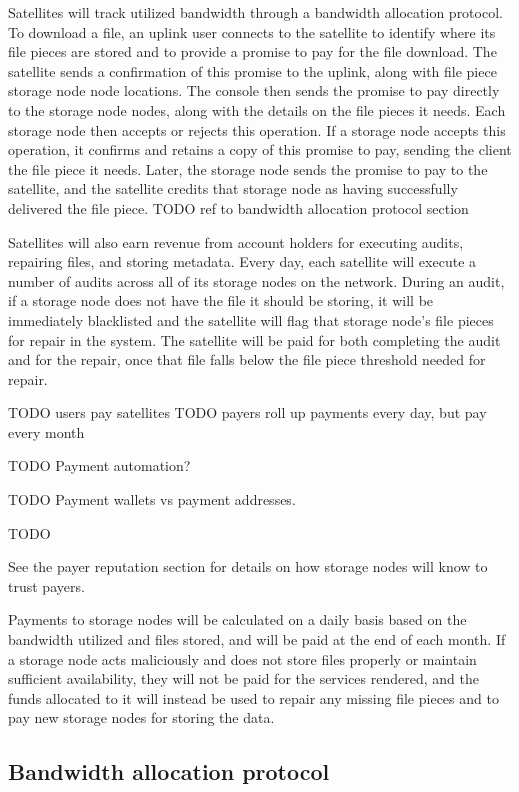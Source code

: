 \documentclass[11pt,fleqn,openany]{book}
\newcommand{\todo}[1]{{\color{red} TODO #1 }}
\begin{document}
Satellites will track utilized bandwidth through a bandwidth allocation
protocol. To download a file, an uplink user connects to the satellite to
identify where its file pieces are stored and to provide a promise to pay for
the file download. The satellite sends a confirmation of this promise
to the uplink, along with file piece storage node node locations.
The console then sends the promise to pay directly
to the storage node nodes, along with the details on the file pieces it needs.
Each storage node then accepts or rejects this operation.
If a storage node accepts this
operation, it confirms and retains a copy of this promise to pay, sending the
client the file piece it needs. Later, the storage node sends the promise to
pay to
the satellite, and the satellite credits that storage node as having
successfully delivered the file piece.
\todo{ref to bandwidth allocation protocol section}

Satellites will also earn revenue from account holders for executing audits,
repairing files, and storing metadata. Every day, each satellite will execute
a number of audits across all of its storage nodes on the network. During an
audit,
if a storage node does not have the file it should be storing, it will be
immediately
blacklisted and the satellite will flag that storage node’s file pieces for
repair
in the system.
The satellite will be paid for both completing the audit
and for the repair,
once that file falls below the file piece threshold needed for
repair.

\todo{users pay satellites}
\todo{payers roll up payments every day, but pay every month}

\todo{Payment automation?}

\todo{Payment wallets vs payment addresses. }

\todo{}

See the payer reputation section for details on
how storage nodes will know to trust payers.

Payments to storage nodes will be calculated on a daily basis based on the
bandwidth
utilized and files stored, and will be paid at the end of each month.
If a storage node acts
maliciously and does not store files properly or maintain sufficient
availability, they will not be paid for the services rendered, and the funds
allocated to it will instead be used to repair any missing
file pieces and to pay new storage nodes for storing the data.

\subsection{Bandwidth allocation protocol}
\end{document}
